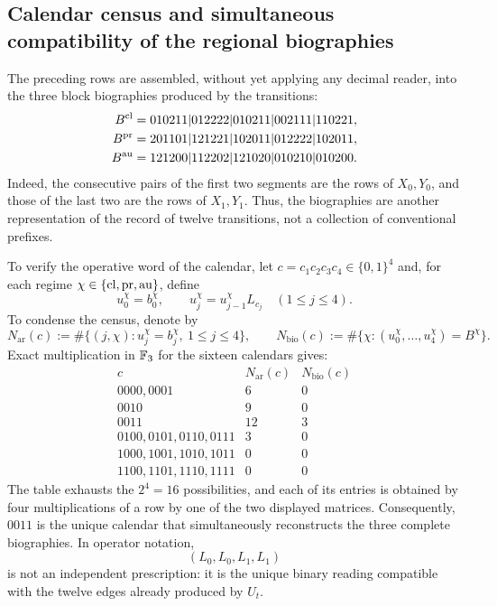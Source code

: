 \begingroup\fontsize{10}{11.8}\selectfont\setlength{\abovedisplayskip}{5pt}\setlength{\belowdisplayskip}{5pt}
\subsection{Calendar census and simultaneous compatibility of the regional biographies}
The preceding rows are assembled, without yet applying any decimal reader,
into the three block biographies produced by the transitions:
\begin{align}
 B^{\rm cl}
  &=010211|012222|010211|002111|110221,\notag\\
 B^{\rm pr}
  &=201101|121221|102011|012222|102011,
 \label{act21:eq:biografias-tpk-tres-caracteres}\\
 B^{\rm au}
  &=121200|112202|121020|010210|010200.\notag
\end{align}
Indeed, the consecutive pairs of the first two segments are the rows
of \(X_0,Y_0\), and those of the last two are the rows of \(X_1,Y_1\).
Thus, the biographies are another representation of the record of twelve
transitions, not a collection of conventional prefixes.

To verify the operative word of the calendar, let
\(c=c_1c_2c_3c_4\in\{0,1\}^4\) and, for each regime
\(\chi\in\{{\rm cl},{\rm pr},{\rm au}\}\), define
\[
 u_0^\chi=b_0^\chi,\qquad
 u_j^\chi=u_{j-1}^\chi L_{c_j}\quad(1\le j\le4).
\]
To condense the census, denote by
\[
 N_{\mathrm{ar}}(c):=
 \#\{(j,\chi):u_j^\chi=b_j^\chi,\ 1\le j\le4\},\qquad
 N_{\mathrm{bio}}(c):=
 \#\{\chi:(u_0^\chi,\ldots,u_4^\chi)=B^\chi\}.
\]
Exact multiplication in \(\mathbb F_3\) for the sixteen calendars gives:
\[
\begin{array}{c|c|c}
 c&N_{\mathrm{ar}}(c)&N_{\mathrm{bio}}(c)\\ \hline
0000,0001&6&0\\
0010&9&0\\
0011&12&3\\
0100,0101,0110,0111&3&0\\
1000,1001,1010,1011&0&0\\
1100,1101,1110,1111&0&0
\end{array}
\tag{D}
\label{act21:eq:censo-dieciseis-calendarios}
\]
The table exhausts the \(2^4=16\) possibilities, and each of its entries is
obtained by four multiplications of a row by one of the two displayed matrices.
Consequently, \(0011\) is the unique calendar that simultaneously reconstructs
the three complete biographies. In operator notation,
\begin{equation}
 (L_0,L_0,L_1,L_1)
 \label{act21:eq:calendario-0011-interno}
\end{equation}
is not an independent prescription: it is the unique binary reading compatible
with the twelve edges already produced by \(U_t\).

